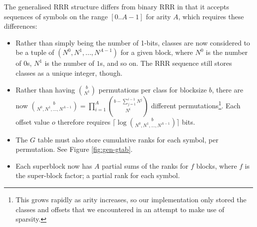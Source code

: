 The generalised RRR structure differs from binary RRR in that it accepts
sequences of symbols on the range $[0..A-1]$ for arity $A$, which requires these
differences:

\begin{itemize}
	\item
		Rather than simply being the number of 1-bits, classes are now 
		considered to be a tuple of $(N^0, N^1, ..., N^{A-1})$ for a given 
		block, where $N^0$ is the number of $0$s, $N^1$ is the number of $1$s, 
		and so on. The RRR sequence still stores classes as a unique integer, 
		though.

	\item
		Rather than having $b \choose N^1$ permutations per class for blocksize 
		$b$, there are now ${b \choose N^0, N^1,...,N^{A-1}} = 
		\prod_{i = 1}^{A} {{b - \sum_{j = 1}^{i - 1} N^j} \choose N^i}
		$ different permutations\footnote{This grows rapidly as arity increases, 
		so our implementation only stored the classes and offsets that we 
		encountered in an attempt to make use of sparsity.}.
		Each offset value $o$ therefore requires $\lceil\log {b \choose N^0, 
		N^1,...,N^{A-1}}\rceil$ bits.

	\item
		The $G$ table must also store cumulative ranks for each symbol, per 
		permutation. See Figure \ref{fig:gen-gtab}.

	\item
		Each superblock now has $A$ partial sums of the ranks for $f$ blocks, 
		where $f$ is the super-block factor; a partial rank for each symbol.
\end{itemize}
